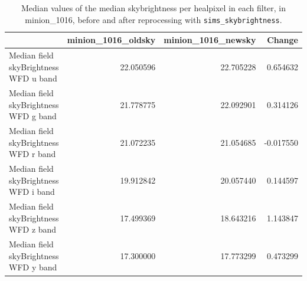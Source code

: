 \documentclass[DM,lsstdraft,authoryear,toc]{lsstdoc}
\newcommand{\simsky}{\texttt{sims\_skybrightness}\xspace}
\begin{document}
\begin{table}
\caption{Median values of the median skybrightness per healpixel in each filter, in minion\_1016, before and after reprocessing with \simsky.}
\begin{center}
\begin{tabular}{lrrr}
{} &  minion\_1016\_oldsky &  minion\_1016\_newsky &    Change \\
\hline
Median field skyBrightness WFD u band &           22.050596 &           22.705228 &  0.654632 \\
Median field skyBrightness WFD g band &           21.778775 &           22.092901 &  0.314126 \\
Median field skyBrightness WFD r band  &           21.072235 &           21.054685 & -0.017550 \\
Median field skyBrightness WFD i band  &           19.912842 &           20.057440 &  0.144597 \\
Median field skyBrightness WFD z band &           17.499369 &           18.643216 &  1.143847 \\
Median field skyBrightness WFD y band  &           17.300000 &           17.773299 &  0.473299 \\
\hline
\end{tabular}
\end{center}
\label{tab:medhealpixskybright}
\end{table}
\end{document}
